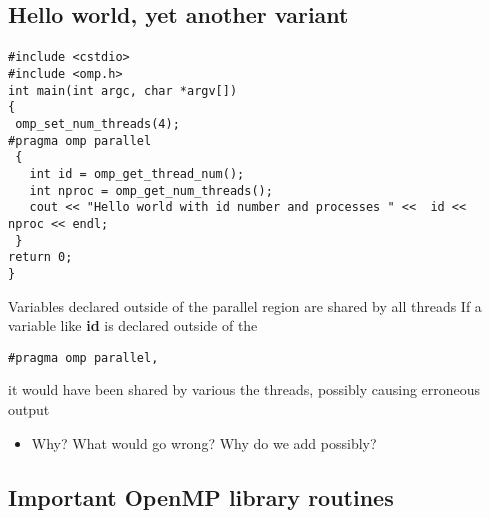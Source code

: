 \documentclass[%
oneside,                 %
final,                   %
10pt]{article}
\begin{document}
\subsection*{Hello world, yet another variant}

\paragraph{}














\begin{verbatim}
#include <cstdio>
#include <omp.h>
int main(int argc, char *argv[]) 
{
 omp_set_num_threads(4); 
#pragma omp parallel
 {
   int id = omp_get_thread_num();
   int nproc = omp_get_num_threads(); 
   cout << "Hello world with id number and processes " <<  id <<  nproc << endl;
 } 
return 0;
}

\end{verbatim}

Variables declared outside of the parallel region are shared by all threads
If a variable like \textbf{id} is  declared outside of the 


\begin{verbatim}
#pragma omp parallel, 

\end{verbatim}

it would have been shared by various the threads, possibly causing erroneous output
\begin{itemize}
 \item Why? What would go wrong? Why do we add  possibly?
\end{itemize}

\noindent



\subsection*{Important OpenMP library routines}

\paragraph{}
\end{document}
